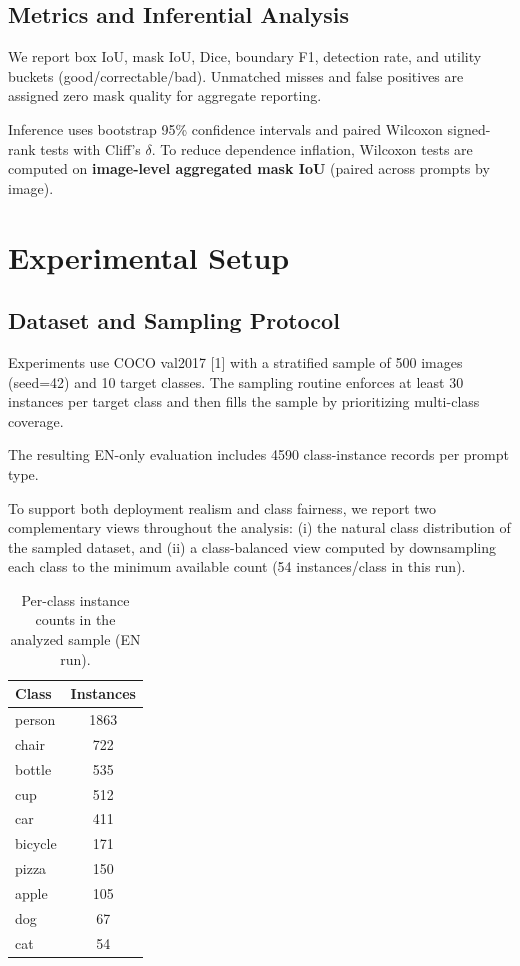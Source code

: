 \documentclass[pdflatex,sn-mathphys-num]{sn-jnl}
\begin{document}
\subsection{Metrics and Inferential Analysis}

We report box IoU, mask IoU, Dice, boundary F1, detection rate, and utility buckets (good/correctable/bad). Unmatched misses and false positives are assigned zero mask quality for aggregate reporting.

Inference uses bootstrap 95\% confidence intervals and paired Wilcoxon signed-rank tests with Cliff's $\delta$. To reduce dependence inflation, Wilcoxon tests are computed on \textbf{image-level aggregated mask IoU} (paired across prompts by image).

\section{Experimental Setup}

\subsection{Dataset and Sampling Protocol}

Experiments use COCO val2017 [1] with a stratified sample of 500 images (seed=42) and 10 target classes. The sampling routine enforces at least 30 instances per target class and then fills the sample by prioritizing multi-class coverage.

The resulting EN-only evaluation includes 4590 class-instance records per prompt type.

To support both deployment realism and class fairness, we report two complementary views throughout the analysis: (i) the natural class distribution of the sampled dataset, and (ii) a class-balanced view computed by downsampling each class to the minimum available count (54 instances/class in this run).

\begin{table}[t]
\caption{Per-class instance counts in the analyzed sample (EN run).}
\label{tab:sample-distribution}
\centering
\begin{tabular}{lc}
\toprule
Class & Instances \\
\midrule
person & 1863 \\
chair & 722 \\
bottle & 535 \\
cup & 512 \\
car & 411 \\
bicycle & 171 \\
pizza & 150 \\
apple & 105 \\
dog & 67 \\
cat & 54 \\
\bottomrule
\end{tabular}
\end{table}
\end{document}
